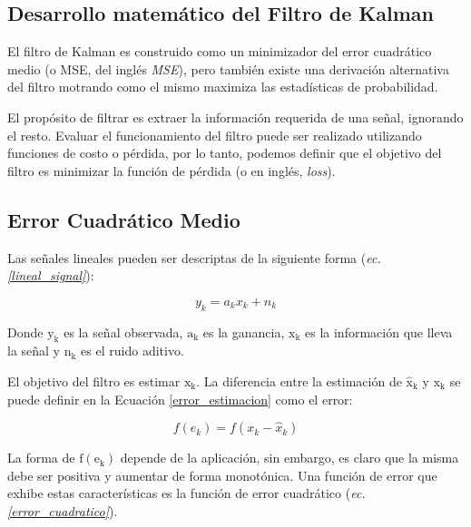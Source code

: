 \documentclass[10pt,a4paper]{article}
\begin{document}
\begin{itemize}
\newpage

\printbibliography[heading=bibintoc]

\newpage

\appendix 

\section{Desarrollo matem\'atico del Filtro de Kalman}\label{matKalman}

\noindent El filtro de Kalman es construido como un minimizador del error 
cuadr\'atico medio (o \acrshort{MSE}, del ingl\'es 
\emph{\acrlong{MSE}}), pero tambi\'en existe una derivaci\'on 
alternativa del filtro motrando como el mismo maximiza las estad\'isticas de 
probabilidad.

\noindent El prop\'osito de filtrar es extraer la informaci\'on requerida de una
señal, ignorando el resto. Evaluar el funcionamiento del filtro puede ser
realizado utilizando funciones de costo o p\'erdida, por lo tanto, podemos
definir que el objetivo del filtro es minimizar la funci\'on de p\'erdida (o en
ingl\'es, \emph{loss}).

\subsection{Error Cuadr\'atico Medio}

\noindent Las señales lineales pueden ser descriptas de la siguiente forma
(\emph{ec.\ref{lineal_signal}}):

\begin{equation}
    y_k = a_k x_k + n_k \label{lineal_signal}
\end{equation}

\noindent Donde $\mathrm{y_k}$ es la señal observada, $\mathrm{a_k}$ es la 
ganancia, $\mathrm{x_k}$ es la informaci\'on que lleva la señal y $\mathrm{n_k}$ 
es el ruido aditivo.

\noindent El objetivo del filtro es estimar $\mathrm{x_k}$. La diferencia entre
la estimaci\'on de $\mathrm{\hat{x}_k}$ y $\mathrm{x_k}$ se puede definir en la
Ecuaci\'on \ref{error_estimacion} como el error:

\begin{equation}
    f(e_k) = f(x_k - \hat{x}_k) \label{error_estimacion}
\end{equation}

La forma de $\mathrm{f(e_k)}$ depende de la aplicaci\'on, sin embargo, es claro
que la misma debe ser positiva y aumentar de forma monot\'onica. Una funci\'on
de error que exhibe estas caracter\'isticas es la funci\'on de error
cuadr\'atico (\emph{ec. \ref{error_cuadratico}}).


\end{itemize}
\end{document}
